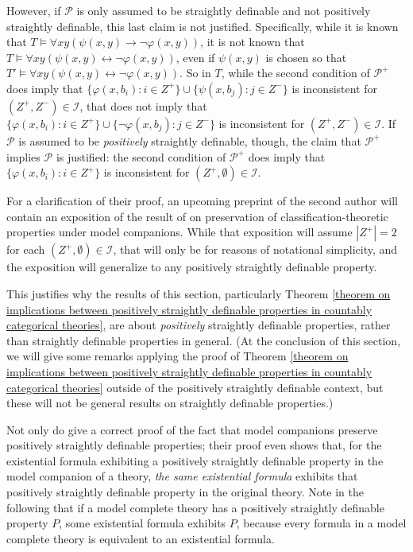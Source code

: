 \documentclass[10pt,a4paper]{amsart}
\newcommand{\vphi}{\varphi}
\begin{document}
{    However, if $\mathcal{P}$ is only assumed to be straightly definable and not positively straightly definable, this last claim is not justified. Specifically, while it is known that $T \models \forall x  y(\psi(x, y) \to \neg\varphi(x, y))$, it is not known that $T \models \forall x y(\psi(x, y) \leftrightarrow \neg\varphi(x, y))$, even if $\psi(x, y)$ is chosen so that $T' \models \forall x y(\psi(x, y) \leftrightarrow \neg\varphi(x, y))$. So in $T$, while the second condition of $\mathcal{P}^{+}$ does imply that $\{\vphi(x,b_i)\colon i\in Z^+\}\cup \{\psi(x,b_j)\colon j\in Z^-\}$ is inconsistent for $(Z^{+}, Z^{-}) \in \mathcal{I}$, that does not imply that $\{\vphi(x,b_i)\colon i\in Z^+\}\cup \{\neg\vphi(x,b_j)\colon j\in Z^-\}$ is inconsistent for $(Z^{+}, Z^{-}) \in \mathcal{I}$. If $\mathcal{P}$ is assumed to be \textit{positively} straightly definable, though, the claim that $\mathcal{P}^{+}$ implies $\mathcal{P}$ is justified: the second condition of $\mathcal{P}^{+}$ does imply that $\{\vphi(x,b_i)\colon i\in Z^+\}$ is inconsistent for $(Z^{+}, \emptyset) \in \mathcal{I}$.
    
    For a clarification of their proof, an upcoming preprint of the second author will contain an exposition of the result of \cite{bodirsky2025taking} on preservation of classification-theoretic properties under model companions. While that exposition will assume $|Z^{+}|=2$ for each $(Z^{+}, \emptyset) \in \mathcal{I}$, that will only be for reasons of notational simplicity, and the exposition will generalize to any positively straightly definable property.}


    This justifies why the results of this section, particularly Theorem \ref{theorem on implications between positively straightly definable properties in countably categorical theories}, are about \textit{positively} straightly definable properties, rather than straightly definable properties in general. (At the conclusion of this section, we will give some remarks applying the proof of Theorem \ref{theorem on implications between positively straightly definable properties in countably categorical theories} outside of the positively straightly definable context, but these will not be general results on straightly definable properties.)


Not only do \cite{bodirsky2025taking} give a correct proof of the fact that model companions preserve positively straightly definable properties; their proof even shows that, for the existential formula exhibiting a positively straightly definable property in the model companion of a theory, \textit{the same existential formula} exhibits that positively straightly definable property in the original theory. Note in the following that if a model complete theory has a positively straightly definable property $P$, some existential formula exhibits $P$, because every formula in a model complete theory is equivalent to an existential formula.
\end{document}
